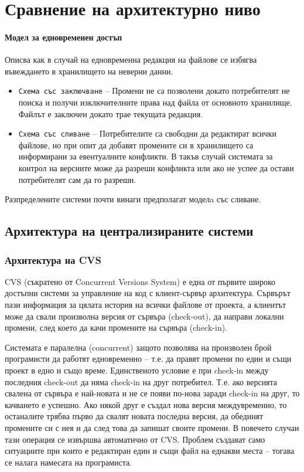 \documentclass[a4paper]{article}
\begin{document}
\section{Сравнение на архитектурно ниво}

  \paragraph{Модел за едновременен достъп}
  Описва как в случай на едновременна редакция на файлове се избягва въвеждането в хранилището на неверни данни.
  \begin{itemize}
    \item \texttt{Схема със заключване} -- Промени не са позволени докато потребителят не поиска и получи изключителните права над файла от основното хранилище. Файлът е заключен докато трае текущата редакция.
    \item \texttt{Схема със сливане} -- Потребителите са свободни да редактират всички файлове, но при опит да добавят промените си в хранилището са информирани за евентуалните конфликти. В такъв случай системата за контрол на версиите може да разреши конфликта или ако не успее да остави потребителят сам да го разреши.
  \end{itemize}
  Разпределените системи почти винаги предполагат моделa със сливане.




  \subsection{Архитектура на централизираните системи}
    \subsubsection{Архитектура на CVS}

    CVS (съкратено от Concurrent Versions System) е една от първите широко
    достъпни системи за управление на код с клиент-сървър архитектура. Сървърът
    пази информация за цялата история на всички файлове от проекта, а клиентът
    може да свали произволна версия от сървъра (check-out), да направи локални
    промени, след което да качи промените на сървъра (check-in).

    Системата е паралелна (concurrent) защото позволява на произволен брой
    програмисти да работят едновременно -- т.е. да правят промени по един и същи
    проект в едно и също време. Единственото условие е при check-in между
    последния check-out да няма check-in на друг потребител. Т.е. ако версията
    свалена от сървъра е най-новата и не се появи по-нова заради check-in на
    друг, то качването е успешно. Ако някой друг е създал нова версия
    междувременно, то останалите трябва първо да свалят новата последна версия,
    да обединят промените си с нея и да след това да запишат своите промени. В повечето случаи тази
    операция се извършва автоматично от CVS. Проблем създават само ситуациите
    при които е редактиран един и същи файл на еднакви места -- тогава се налага
    намесата на програмиста.
\end{document}
